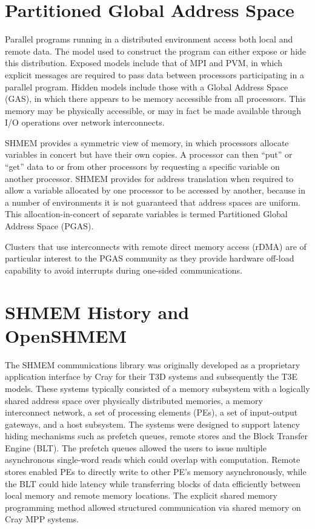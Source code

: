 \documentclass[english]{article}
\begin{document}
\section{Partitioned Global Address Space}

Parallel programs running in a distributed environment access both
local and remote data. The model used to construct the program can
either expose or hide this distribution. Exposed models include that
of MPI and PVM, in which explicit messages are required to pass data
between processors participating in a parallel program. Hidden models
include those with a Global Address Space (GAS), in which there appears
to be memory accessible from all processors. This memory may be physically
accessible, or may in fact be made available through I/O operations
over network interconnects.

SHMEM provides a symmetric view of memory, in which processors allocate
variables in concert but have their own copies. A processor can then
{}``put'' or {}``get'' data to or from other processors by requesting
a specific variable on another processor. SHMEM provides for address
translation when required to allow a variable allocated by one processor
to be accessed by another, because in a number of environments it
is not guaranteed that address spaces are uniform. This allocation-in-concert
of separate variables is termed Partitioned Global Address Space (PGAS).

Clusters that use interconnects with remote direct memory access (rDMA)
are of particular interest to the PGAS community as they provide hardware
off-load capability to avoid interrupts during one-sided communications.


\section{SHMEM History and OpenSHMEM}

The SHMEM communications library was originally developed as a proprietary
application interface by Cray for their T3D systems and subsequently
the T3E models. These systems typically consisted of a memory subsystem
with a logically shared address space over physically distributed
memories, a memory interconnect network, a set of processing elements
(PEs), a set of input-output gateways, and a host subsystem. The systems
were designed to support latency hiding mechanisms such as prefetch
queues, remote stores and the Block Transfer Engine (BLT). The prefetch
queues allowed the users to issue multiple asynchronous single-word
reads which could overlap with computation. Remote stores enabled
PEs to directly write to other PE's memory asynchronously, while the
BLT could hide latency while transferring blocks of data efficiently
between local memory and remote memory locations. The explicit shared
memory programming method allowed structured communication via shared
memory on Cray MPP systems. 
\end{document}
